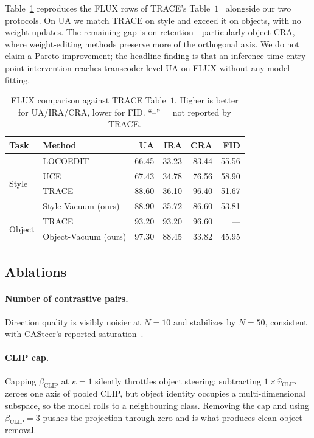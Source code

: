 \documentclass{article}
\begin{document}
Table~\ref{tab:compare} reproduces the FLUX rows of TRACE's
Table~$1$~\cite{tracepaper} alongside our two protocols. On UA we
match TRACE on style and exceed it on objects, with no weight
updates. The remaining gap is on retention---particularly object
CRA, where weight-editing methods preserve more of the orthogonal
axis. We do not claim a Pareto improvement; the headline finding is
that an inference-time entry-point intervention reaches
transcoder-level UA on FLUX without any model fitting.

\begin{table}[t]
\caption{FLUX comparison against TRACE Table~$1$. Higher is better
for UA/IRA/CRA, lower for FID. ``--'' = not reported by TRACE.}
\label{tab:compare}
\centering
\small
\begin{tabular}{llrrrr}
\toprule
Task & Method & UA & IRA & CRA & FID \\
\midrule
\multirow{4}{*}{Style}
 & LOCOEDIT~\cite{tracepaper}      & 66.45 & 33.23 & 83.44 & 55.56 \\
 & UCE~\cite{gandikota2024unified} & 67.43 & 34.78 & 76.56 & 58.90 \\
 & TRACE~\cite{tracepaper}         & 88.60 & 36.10 & 96.40 & 51.67 \\
 & Style-Vacuum (ours)             & 88.90 & 35.72 & 86.60 & 53.81 \\
\midrule
\multirow{2}{*}{Object}
 & TRACE~\cite{tracepaper}         & 93.20 & 93.20 & 96.60 & --- \\
 & Object-Vacuum (ours)            & 97.30 & 88.45 & 33.82 & 45.95 \\
\bottomrule
\end{tabular}
\end{table}

\subsection{Ablations}
\label{sec:exp_abl}

\paragraph{Number of contrastive pairs.} Direction quality is
visibly noisier at $N{=}10$ and stabilizes by $N{=}50$, consistent
with CASteer's reported saturation~\cite{khrulkov2024casteer}.

\paragraph{CLIP cap.} Capping $\beta_{\mathrm{CLIP}}$ at
$\kappa{=}1$ silently throttles object steering: subtracting
$1\!\times\!\hat v_{\mathrm{CLIP}}$ zeroes one axis of pooled CLIP,
but object identity occupies a multi-dimensional subspace, so the
model rolls to a neighbouring class. Removing the cap and using
$\beta_{\mathrm{CLIP}}{=}3$ pushes the projection through zero and is
what produces clean object removal.
\end{document}
